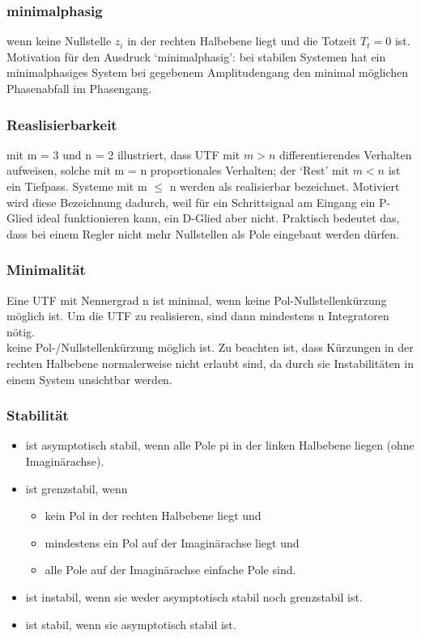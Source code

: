 \subsubsection{minimalphasig}
wenn keine Nullstelle $z_i$ in der rechten Halbebene liegt und die Totzeit $T_t = 0$ ist.
Motivation für den Ausdruck ‘minimalphasig’: bei stabilen Systemen hat ein
minimalphasiges System bei gegebenem Amplitudengang den minimal möglichen
Phasenabfall im Phasengang.
\subsubsection{Reaslisierbarkeit}
mit m = 3 und n = 2 illustriert, dass UTF mit $m > n$ differentierendes Verhalten
aufweisen, solche mit m = n proportionales Verhalten; der ‘Rest’ mit $m < n$ ist
ein Tiefpass. Systeme mit m $\leq$ n werden als realisierbar bezeichnet. Motiviert wird
diese Bezeichnung dadurch, weil für ein Schrittsignal am Eingang ein P-Glied ideal
funktionieren kann, ein D-Glied aber nicht. Praktisch bedeutet das, dass bei einem Regler nicht mehr Nullstellen als Pole
eingebaut werden dürfen.
\subsubsection{Minimalität}

Eine UTF mit Nennergrad n ist minimal, wenn keine Pol-Nullstellenkürzung
möglich ist. Um die UTF zu realisieren, sind dann mindestens n Integratoren nötig.\\
keine Pol-/Nullstellenkürzung möglich ist. Zu beachten ist, dass Kürzungen in
der rechten Halbebene normalerweise nicht erlaubt sind, da durch sie Instabilitäten
in einem System unsichtbar werden.

\subsubsection{Stabilität}
\begin{itemize}
\item  ist asymptotisch stabil, wenn
alle Pole pi in der linken Halbebene liegen (ohne Imaginärachse).
\item  ist grenzstabil, wenn
\begin{itemize}
\item kein Pol in der rechten Halbebene liegt und
\item mindestens ein Pol auf der Imaginärachse liegt und
\item alle Pole auf der Imaginärachse einfache Pole sind.
\end{itemize}
\item  ist instabil, wenn
sie weder asymptotisch stabil noch grenzstabil ist.
\item  ist stabil, wenn
sie asymptotisch stabil ist.
\end{itemize}


